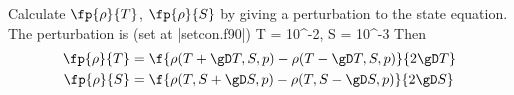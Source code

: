 
Calculate $\fp{\rho}{T}$, $\fp{\rho}{S}$ by giving a perturbation to the state
equation. The perturbation is (set at |setcon.f90|)
\be
\gD T = 10^{-2}, \gD S = 10^{-3}
\ee
Then
\bese
\begin{align}
\fp{\rho}{T} &= \f{\rho(T+\gD T,S,p) - \rho(T-\gD T,S,p)}{2\gD T} \\
\fp{\rho}{S} &= \f{\rho(T,S+\gD S,p) - \rho(T,S-\gD S,p)}{2\gD S} \\
\end{align}
\ense

